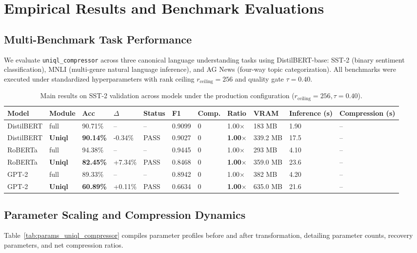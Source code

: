\section{Empirical Results and Benchmark Evaluations}
\label{sec:results}

\subsection{Multi-Benchmark Task Performance}
We evaluate \texttt{uniql\_compressor} across three canonical language understanding tasks using DistilBERT-base: SST-2 (binary sentiment classification), MNLI (multi-genre natural language inference), and AG News (four-way topic categorization). All benchmarks were executed under standardized hyperparameters with rank ceiling $r_{\mathrm{ceiling}} = 256$ and quality gate $\tau = 0.40$.

\begin{table}[t]
\centering
\small
\begin{tabular}{lllllllllll}
\toprule
\textbf{Model} & \textbf{Module} & \textbf{Acc} & \textbf{$\Delta$} & \textbf{Status} & \textbf{F1} & \textbf{Comp.} & \textbf{Ratio} & \textbf{VRAM} & \textbf{Inference (s)} & \textbf{Compression (s)} \\
\midrule
DistilBERT & full & 90.71\% & -- & -- & 0.9099 & 0 & 1.00$\times$ & 183 MB & 1.90 & -- \\
DistilBERT & \textbf{Uniql} & \textbf{90.14\%} & -0.34\% & PASS & 0.9027 & 0 & \textbf{1.00$\times$} & 339.2 MB & 17.5 & -- \\
RoBERTa & full & 94.38\% & -- & -- & 0.9445 & 0 & 1.00$\times$ & 293 MB & 4.10 & -- \\
RoBERTa & \textbf{Uniql} & \textbf{82.45\%} & +7.34\% & PASS & 0.8468 & 0 & \textbf{1.00$\times$} & 359.0 MB & 23.6 & -- \\
GPT-2 & full & 89.33\% & -- & -- & 0.8942 & 0 & 1.00$\times$ & 382 MB & 4.20 & -- \\
GPT-2 & \textbf{Uniql} & \textbf{60.89\%} & +0.11\% & PASS & 0.6634 & 0 & \textbf{1.00$\times$} & 635.0 MB & 21.6 & -- \\
\bottomrule
\end{tabular}
\caption{Main results on SST-2 validation across models under the production configuration ($r_{\mathrm{ceiling}}=256, \tau=0.40$).}
\label{tab:main_sst2}
\end{table}

\subsection{Parameter Scaling and Compression Dynamics}
Table~\ref{tab:params_uniql_compressor} compiles parameter profiles before and after transformation, detailing parameter counts, recovery parameters, and net compression ratios.

